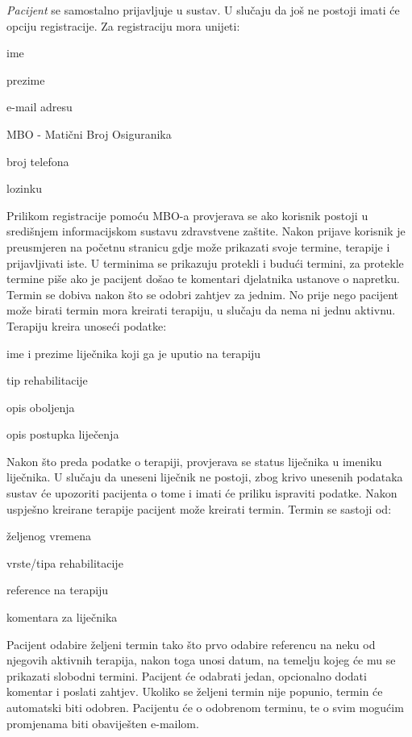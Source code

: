 		\textit{Pacijent} se samostalno prijavljuje u sustav. U slučaju da još ne postoji imati će opciju registracije. Za registraciju mora unijeti: 
		\begin{packed_item}
			\item ime
			\item prezime
			\item e-mail adresu
			\item MBO - Matični Broj Osiguranika
			\item broj telefona
			\item lozinku
		\end{packed_item}
		Prilikom registracije pomoću MBO-a provjerava se ako korisnik postoji u središnjem informacijskom sustavu zdravstvene zaštite.
		Nakon prijave korisnik je preusmjeren na početnu stranicu gdje može prikazati svoje termine, terapije i prijavljivati iste. U terminima se prikazuju protekli i budući termini, za protekle termine piše ako je pacijent došao te komentari djelatnika ustanove o napretku. Termin se dobiva nakon što se odobri zahtjev za jednim. No prije nego pacijent može birati termin mora kreirati terapiju, u slučaju da nema ni jednu aktivnu. Terapiju kreira unoseći podatke:
		\begin{packed_item}
			\item ime i prezime liječnika koji ga je uputio na terapiju
			\item tip rehabilitacije
			\item opis oboljenja 
			\item opis postupka liječenja
		\end{packed_item}
		Nakon što preda podatke o terapiji, provjerava se status liječnika u imeniku liječnika. U slučaju da uneseni liječnik ne postoji, zbog krivo unesenih podataka sustav će upozoriti pacijenta o tome i imati će priliku ispraviti podatke. Nakon uspješno kreirane terapije pacijent može kreirati termin. 
		Termin se sastoji od:
		\begin{packed_item}
			\item željenog vremena 
			\item vrste/tipa rehabilitacije
			\item reference na terapiju
			\item komentara za liječnika
		\end{packed_item}
		Pacijent odabire željeni termin tako što prvo odabire referencu na neku od njegovih aktivnih terapija, nakon toga unosi datum, na temelju kojeg će mu se prikazati slobodni termini. Pacijent će odabrati jedan, opcionalno dodati komentar i poslati zahtjev. Ukoliko se željeni termin nije popunio, termin će automatski biti odobren. Pacijentu će o odobrenom terminu, te o svim mogućim promjenama biti obaviješten e-mailom.
		

